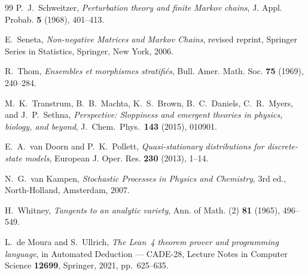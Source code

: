 \documentclass[11pt,reqno]{amsart}
\theoremstyle{plain}
\theoremstyle{definition}
\theoremstyle{remark}
\begin{document}
\begin{thebibliography}{99}
 P.~J.~Schweitzer, \emph{Perturbation theory and finite
Markov chains}, J. Appl. Probab. \textbf{5} (1968), 401--413.

 E.~Seneta, \emph{Non-negative Matrices and Markov Chains},
revised reprint, Springer Series in Statistics, Springer, New York, 2006.

 R.~Thom, \emph{Ensembles et morphismes stratifi\'es}, Bull.
Amer. Math. Soc. \textbf{75} (1969), 240--284.

 M.~K.~Transtrum, B.~B.~Machta, K.~S.~Brown, B.~C.~Daniels,
C.~R.~Myers, and J.~P.~Sethna, \emph{Perspective: Sloppiness and emergent theories
in physics, biology, and beyond}, J.\ Chem.\ Phys.\ \textbf{143} (2015), 010901.

 E.~A.~van Doorn and P.~K.~Pollett,
\emph{Quasi-stationary distributions for discrete-state models}, European J. Oper.
Res. \textbf{230} (2013), 1--14.

 N.~G.~van Kampen, \emph{Stochastic Processes in Physics and
Chemistry}, 3rd ed., North-Holland, Amsterdam, 2007.

 H.~Whitney, \emph{Tangents to an analytic variety}, Ann. of
Math. (2) \textbf{81} (1965), 496--549.

 L.~de Moura and S.~Ullrich, \emph{The Lean~4 theorem prover and
programming language}, in Automated Deduction --- CADE-28, Lecture Notes in Computer Science
\textbf{12699}, Springer, 2021, pp.~625--635.

\end{thebibliography}
\end{document}
